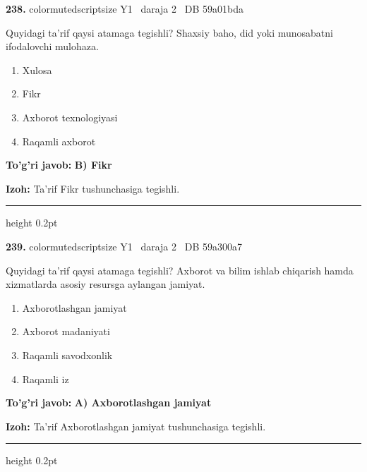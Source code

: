 \documentclass[10pt,a4paper,oneside]{article}
\begin{document}
\noindent\textbf{\color{ink}238.}  {color{muted}scriptsize Y1 \textbullet\ daraja 2 \textbullet\ DB 59a01bda}
\par
Quyidagi ta'rif qaysi atamaga tegishli? Shaxsiy baho, did yoki munosabatni ifodalovchi mulohaza.
\begin{enumerate}[label=\Alph*),leftmargin=9mm]
\item Xulosa
\item Fikr
\item Axborot texnologiyasi
\item Raqamli axborot
\end{enumerate}
\begin{tcolorbox}[enhanced,breakable,colback=teal!4,colframe=teal!50!black,boxrule=0.5pt,arc=1.1mm,left=3mm,right=3mm,top=1.7mm,bottom=1.7mm,before skip=2mm,after skip=2mm]
\textbf{\color{teal}To'g'ri javob:} \textbf{B) Fikr}
\par\smallskip
\textbf{Izoh:} Ta'rif Fikr tushunchasiga tegishli.
\end{tcolorbox}
\vspace{2mm}\hrule height 0.2pt \vspace{3mm}

\noindent\textbf{\color{ink}239.}  {color{muted}scriptsize Y1 \textbullet\ daraja 2 \textbullet\ DB 59a300a7}
\par
Quyidagi ta'rif qaysi atamaga tegishli? Axborot va bilim ishlab chiqarish hamda xizmatlarda asosiy resursga aylangan jamiyat.
\begin{enumerate}[label=\Alph*),leftmargin=9mm]
\item Axborotlashgan jamiyat
\item Axborot madaniyati
\item Raqamli savodxonlik
\item Raqamli iz
\end{enumerate}
\begin{tcolorbox}[enhanced,breakable,colback=teal!4,colframe=teal!50!black,boxrule=0.5pt,arc=1.1mm,left=3mm,right=3mm,top=1.7mm,bottom=1.7mm,before skip=2mm,after skip=2mm]
\textbf{\color{teal}To'g'ri javob:} \textbf{A) Axborotlashgan jamiyat}
\par\smallskip
\textbf{Izoh:} Ta'rif Axborotlashgan jamiyat tushunchasiga tegishli.
\end{tcolorbox}
\vspace{2mm}\hrule height 0.2pt \vspace{3mm}
\end{document}
